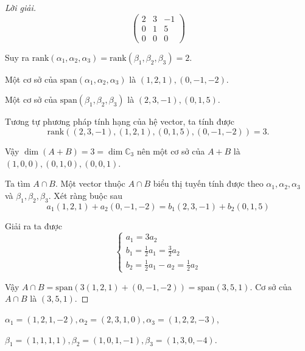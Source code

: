 \documentclass[class=linearalgebra,crop=false]{standalone}
\begin{document}
\begin{proof}[Lời giải]
\[        \begin{pmatrix}
            2 & 3 & -1 \\
            0 & 1 & 5  \\
            0 & 0 & 0
        \end{pmatrix}
    \]
    \par Suy ra $\text{rank}(\alpha_{1},\alpha_{2},\alpha_{3}) = \text{rank}(\beta_{1},\beta_{2},\beta_{3}) = 2$.
    \par Một cơ sở của $\text{span}(\alpha_{1},\alpha_{2},\alpha_{3})$ là $(1,2,1), (0,-1,-2)$.
    \par Một cơ sở của $\text{span}(\beta_{1},\beta_{2},\beta_{3})$ là $(2,3,-1), (0,1,5)$.
    \par Tương tự phương pháp tính hạng của hệ vector, ta tính được
    \[ \text{rank}((2,3,-1),(1,2,1),(0,1,5),(0,-1,-2)) = 3. \]
    \par Vậy $\dim (A + B) = 3 = \dim\mathbb{C}_{3}$ nên một cơ sở của $A + B$ là $(1,0,0), (0,1,0), (0,0,1)$.
    \par Ta tìm $A\cap B$. Một vector thuộc $A\cap B$ biểu thị tuyến tính được theo $\alpha_{1}, \alpha_{2}, \alpha_{3}$ và $\beta_{1}, \beta_{2}, \beta_{3}$. Xét ràng buộc sau
    \[ a_{1}(1,2,1) + a_{2}(0,-1,-2) = b_{1}(2,3,-1) + b_{2}(0,1,5) \]
    \par Giải ra ta được
    \[
        \begin{cases}
            a_{1} = 3a_{2}                              \\
            b_{1} = \frac{1}{2}a_{1} = \frac{3}{2}a_{2} \\
            b_{2} = \frac{1}{2}a_{1} - a_{2} = \frac{1}{2}a_{2}
        \end{cases}
    \]
    \par Vậy $A\cap B = \text{span}(3(1,2,1) + (0,-1,-2)) = \text{span}(3,5,1)$. Cơ sở của $A\cap B$ là $(3,5,1)$.
\end{proof}

\begin{exercise}$\alpha_{1} = (1,2,1,-2), \alpha_{2} = (2,3,1,0), \alpha_{3} = (1,2,2,-3)$,
    \par $\beta_{1} = (1,1,1,1), \beta_{2} = (1,0,1,-1), \beta_{3} = (1,3,0,-4)$.
\end{exercise}
\end{document}

